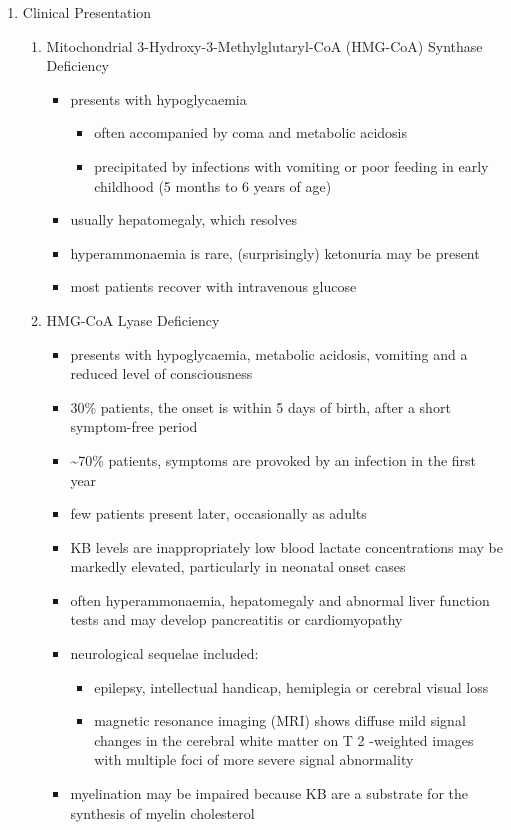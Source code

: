 \documentclass{scrartcl}
\begin{document}
\begin{enumerate}
\item Clinical Presentation
\label{sec:org6a7d2b1}
\begin{enumerate}
\item Mitochondrial 3-Hydroxy-3-Methylglutaryl-CoA (HMG-CoA) Synthase Deficiency
\label{sec:org590e3a8}
\begin{itemize}
\item presents with hypoglycaemia
\begin{itemize}
\item often accompanied by coma and metabolic acidosis
\item precipitated by infections with vomiting or poor feeding in early
childhood (5 months to 6 years of age)
\end{itemize}
\item usually hepatomegaly, which resolves
\item hyperammonaemia is rare, (surprisingly) ketonuria may be present
\item most patients recover with intravenous glucose
\end{itemize}

\item HMG-CoA Lyase Deficiency
\label{sec:org61489d1}
\begin{itemize}
\item presents with hypoglycaemia, metabolic acidosis, vomiting and a
reduced level of consciousness
\item 30\% patients, the onset is within 5 days of birth, after a short symptom-free period
\item \textasciitilde{}70\% patients, symptoms are provoked by an infection in the first year
\item few patients present later, occasionally as adults
\item KB levels are inappropriately low blood lactate concentrations
may be markedly elevated, particularly in neonatal onset cases
\item often hyperammonaemia, hepatomegaly and abnormal liver function tests and
may develop pancreatitis or cardiomyopathy
\item neurological sequelae included:
\begin{itemize}
\item epilepsy, intellectual handicap, hemiplegia or cerebral visual loss
\item magnetic resonance imaging (MRI) shows diffuse mild signal changes
in the cerebral white matter on T 2 -weighted images with multiple
foci of more severe signal abnormality
\end{itemize}
\item myelination may be impaired because KB are a substrate for the
synthesis of myelin cholesterol
\end{itemize}
\end{enumerate}


\end{enumerate}
\end{document}
